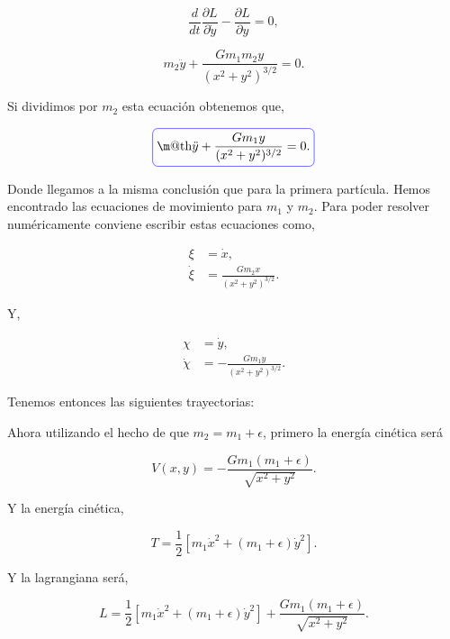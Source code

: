 \documentclass[a4paper,10pt]{article}
\makeatletter
\numberwithin{equation}{section}
\newcommand*{\boxcolor}{blue}
\renewcommand{\boxed}[1]{\textcolor{\boxcolor}{%
\tikz[baseline={([yshift=-1ex]current bounding box.center)}] \node [rectangle, minimum width=1ex,rounded corners,draw] {\normalcolor\m@th$\displaystyle#1$};}}
\makeatother
\begin{document}
\begin{equation}
 \frac{d}{dt} \frac{\partial L}{\partial \dot{y}} - \frac{\partial L}{\partial y} = 0,
\end{equation}

\begin{equation}
 m_2\ddot{y} + \frac{G m_1 m_2 y}{(x^2+y^2)^{3/2}} = 0.
\end{equation}

Si dividimos por $m_2$ esta ecuación obtenemos que,

\begin{equation}
 \boxed{\ddot{y} + \frac{G m_1 y}{(x^2+y^2)^{3/2}} = 0.}
\end{equation}

Donde llegamos a la misma conclusión que para la primera partícula. 
Hemos encontrado las ecuaciones de movimiento para $m_1$ y $m_2$. 
Para poder resolver numéricamente conviene escribir estas ecuaciones como,

\begin{align}
 \xi &= \dot{x}, \\ 
 \dot{\xi} &= \frac{G m_2 x }{(x^2+y^2)^{3/2}}.
\end{align}

Y,

\begin{align}
 \chi &= \dot{y}, \\
 \dot{\chi} &= - \frac{G m_1 y }{(x^2+y^2)^{3/2}}.
\end{align}

Tenemos entonces las siguientes trayectorias:


\vspace{.3cm}

Ahora utilizando el hecho de que $m_2 = m_1 + \epsilon$, primero la energía cinética será

\begin{equation}
 V(x,y) = - \frac{G m_1 (m_1 + \epsilon)}{\sqrt{x^2+y^2}}. 
\end{equation}

Y la energía cinética,

\begin{equation}
  T = \frac{1}{2} [m_1 \dot{x}^2 +  (m_1+\epsilon) \dot{y}^2].
\end{equation}

Y la lagrangiana será,

\begin{equation}
 L = \frac{1}{2} [m_1 \dot{x}^2 +  (m_1 + \epsilon) \dot{y}^2] + 
 \frac{G m_1 (m_1 + \epsilon)}{\sqrt{x^2+y^2}}.
\end{equation}
\end{document}
